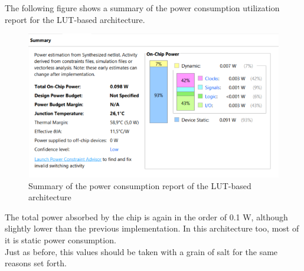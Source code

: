 The following figure shows a summary of the power consumption utilization report for the LUT-based architecture.

\begin{figure}[H]
    \begin{center}
        \includegraphics[scale=.85,clip]{img/vivado_lut_power.png}
    \end{center}
    \vspace*{-0.5cm}
    \caption{Summary of the power consumption report of the LUT-based architecture}
    \label{fig:vivado_bit_power}
\end{figure}

The total power absorbed by the chip is again in the order of 0.1 W, although slightly lower than the previous implementation. In this architecture too, most of it is static power consumption.\\
Just as before, this values should be taken with a grain of salt for the same reasons set forth.